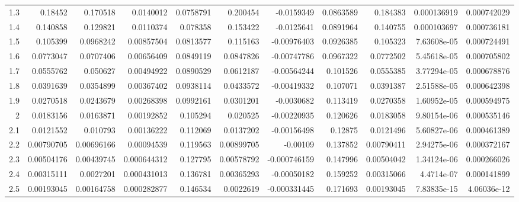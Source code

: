 {\begin{tabular}{rrrrrrrrrrr}
  1.3         & 0.18452    & 0.170518   &   0.0140012   &     0.0758791 & 0.200454   &  -0.0159349   &     0.0863589 & 0.184383   &   0.000136919 &   0.000742029 \\
  1.4         & 0.140858   & 0.129821   &   0.0110374   &     0.078358  & 0.153422   &  -0.0125641   &     0.0891964 & 0.140755   &   0.000103697 &   0.000736181 \\
  1.5         & 0.105399   & 0.0968242  &   0.00857504  &     0.0813577 & 0.115163   &  -0.00976403  &     0.0926385 & 0.105323   &   7.63608e-05 &   0.000724491 \\
  1.6         & 0.0773047  & 0.0707406  &   0.00656409  &     0.0849119 & 0.0847826  &  -0.00747786  &     0.0967322 & 0.0772502  &   5.45618e-05 &   0.000705802 \\
  1.7         & 0.0555762  & 0.050627   &   0.00494922  &     0.0890529 & 0.0612187  &  -0.00564244  &     0.101526  & 0.0555385  &   3.77294e-05 &   0.000678876 \\
  1.8         & 0.0391639  & 0.0354899  &   0.00367402  &     0.0938114 & 0.0433572  &  -0.00419332  &     0.107071  & 0.0391387  &   2.51588e-05 &   0.000642398 \\
  1.9         & 0.0270518  & 0.0243679  &   0.00268398  &     0.0992161 & 0.0301201  &  -0.0030682   &     0.113419  & 0.0270358  &   1.60952e-05 &   0.000594975 \\
  2           & 0.0183156  & 0.0163871  &   0.00192852  &     0.105294  & 0.020525   &  -0.00220935  &     0.120626  & 0.0183058  &   9.80154e-06 &   0.000535146 \\
  2.1         & 0.0121552  & 0.010793   &   0.00136222  &     0.112069  & 0.0137202  &  -0.00156498  &     0.12875   & 0.0121496  &   5.60827e-06 &   0.000461389 \\
  2.2         & 0.00790705 & 0.00696166 &   0.00094539  &     0.119563  & 0.00899705 &  -0.00109     &     0.137852  & 0.00790411 &   2.94275e-06 &   0.000372167 \\
  2.3         & 0.00504176 & 0.00439745 &   0.000644312 &     0.127795  & 0.00578792 &  -0.000746159 &     0.147996  & 0.00504042 &   1.34124e-06 &   0.000266026 \\
  2.4         & 0.00315111 & 0.0027201  &   0.000431013 &     0.136781  & 0.00365293 &  -0.00050182  &     0.159252  & 0.00315066 &   4.4714e-07  &   0.000141899 \\
  2.5         & 0.00193045 & 0.00164758 &   0.000282877 &     0.146534  & 0.0022619  &  -0.000331445 &     0.171693  & 0.00193045 &   7.83835e-15 &   4.06036e-12 \\
\hline
\end{tabular}
}
